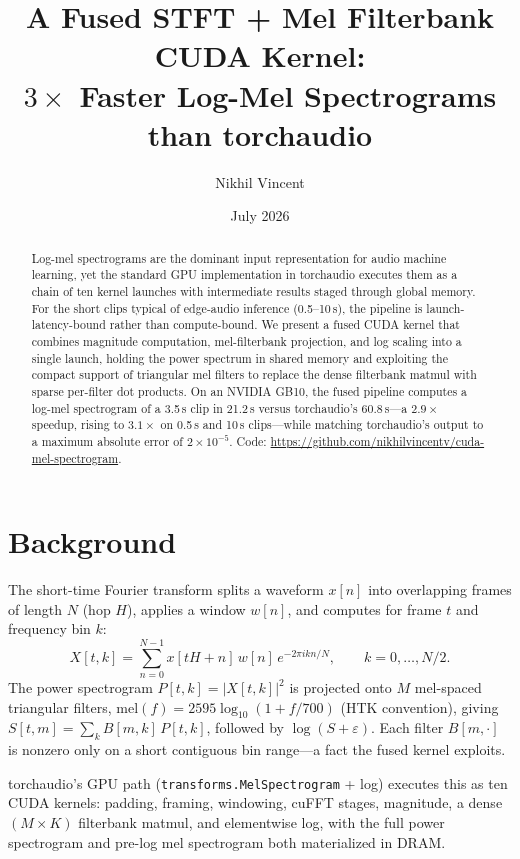 \documentclass[10pt]{article}
\title{A Fused STFT + Mel Filterbank CUDA Kernel:\\
       $3\times$ Faster Log-Mel Spectrograms than torchaudio}
\author{Nikhil Vincent}
\date{July 2026}
\begin{document}
\maketitle

\begin{abstract}
Log-mel spectrograms are the dominant input representation for audio machine
learning, yet the standard GPU implementation in torchaudio executes them as a
chain of ten kernel launches with intermediate results staged through global
memory. For the short clips typical of edge-audio inference (0.5--10\,s), the
pipeline is launch-latency-bound rather than compute-bound. We present a fused
CUDA kernel that combines magnitude computation, mel-filterbank projection,
and log scaling into a single launch, holding the power spectrum in shared
memory and exploiting the compact support of triangular mel filters to replace
the dense filterbank matmul with sparse per-filter dot products. On an NVIDIA
GB10, the fused pipeline computes a log-mel spectrogram of a 3.5\,s clip in
21.2\,\textmu s versus torchaudio's 60.8\,\textmu s---a $2.9\times$ speedup,
rising to $3.1\times$ on 0.5\,s and 10\,s clips---while matching torchaudio's
output to a maximum absolute error of $2\times10^{-5}$. Code:
\url{https://github.com/nikhilvincentv/cuda-mel-spectrogram}.
\end{abstract}

\section{Background}

The short-time Fourier transform splits a waveform $x[n]$ into overlapping
frames of length $N$ (hop $H$), applies a window $w[n]$, and computes for
frame $t$ and frequency bin $k$:
\begin{equation}
X[t,k] = \sum_{n=0}^{N-1} x[tH+n]\, w[n]\, e^{-2\pi i kn/N},
\qquad k = 0,\dots,N/2.
\end{equation}
The power spectrogram $P[t,k] = |X[t,k]|^2$ is projected onto $M$ mel-spaced
triangular filters, $\mathrm{mel}(f) = 2595\log_{10}(1+f/700)$ (HTK
convention), giving $S[t,m] = \sum_k B[m,k]\, P[t,k]$, followed by
$\log(S+\varepsilon)$. Each filter $B[m,\cdot]$ is nonzero only on a short
contiguous bin range---a fact the fused kernel exploits.

torchaudio's GPU path (\texttt{transforms.MelSpectrogram} + log) executes this
as ten CUDA kernels: padding, framing, windowing, cuFFT stages, magnitude,
a dense $(M \times K)$ filterbank matmul, and elementwise log, with the full
power spectrogram and pre-log mel spectrogram both materialized in DRAM.
\end{document}
